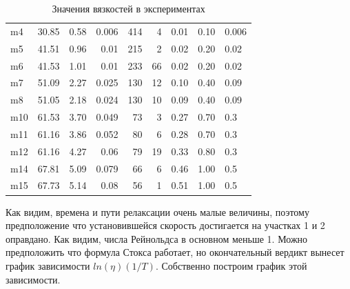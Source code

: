 \documentclass[a4paper, 12pt]{article}
\begin{document}
\begin{table}
\begin{center}
\begin{tabular}{|l|l|rr|rr|lll|}
            m4  & 30.85           & 0.58        & 0.006              & 414            & 4                    & 0.01 & 0.10         & 0.006       \\
            m5  & 41.51           & 0.96        & 0.01               & 215            & 2                    & 0.02 & 0.20         & 0.02        \\
            m6  & 41.53           & 1.01        & 0.01               & 233            & 66                   & 0.02 & 0.20         & 0.02        \\
            m7  & 51.09           & 2.27        & 0.025              & 130            & 12                   & 0.10 & 0.40         & 0.09        \\
            m8  & 51.05           & 2.18        & 0.024              & 130            & 10                   & 0.09 & 0.40         & 0.09        \\
            m10 & 61.53           & 3.70        & 0.049              & 73             & 3                    & 0.27 & 0.70         & 0.3         \\
            m11 & 61.16           & 3.86        & 0.052              & 80             & 6                    & 0.28 & 0.70         & 0.3         \\
            m12 & 61.16           & 4.27        & 0.06               & 79             & 19                   & 0.33 & 0.80         & 0.3         \\
            m14 & 67.81           & 5.09        & 0.079              & 66             & 6                    & 0.46 & 1.00         & 0.5         \\
            m15 & 67.73           & 5.14        & 0.08               & 56             & 1                    & 0.51 & 1.00         & 0.5         \\
            \hline
        \end{tabular}
    \end{center}

    \caption{Значения вязкостей в экспериментах}
    \label{data}
\end{table}

Как видим, времена и пути релаксации очень малые величины, поэтому предположение
что установившейся скорость достигается на участках 1 и 2 оправдано. Как видим,
числа Рейнольдса в основном меньше 1. Можно предположить что формула Стокса
работает, но окончательный вердикт вынесет график зависимости $ln(\eta)(1/T)$.
Собственно построим график этой зависимости.
\end{document}
